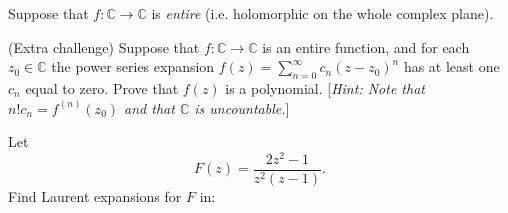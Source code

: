 \documentclass[answers]{exam}
\begin{document}
\begin{questions}
\question%
Suppose that $f:\mathbb C\to\mathbb C$ is \emph{entire} (i.e. holomorphic on the whole complex plane).



\question%
(Extra challenge) Suppose that $f: \mathbb{C} \to \mathbb{C}$ is an entire function, and for each $z_{0} \in \mathbb{C}$ the power series expansion $f(z)=\sum_{n=0}^{\infty} c_{n}(z-z_{0})^{n}$ has at least one $c_{n}$ equal to zero. Prove that $f(z)$ is a polynomial. [\emph{Hint: Note that $n!c_{n}=f^{(n)}(z_{0})$ and that $\mathbb{C}$ is uncountable.}]



\question%



\question%
Let \[
	F(z)=\frac{2z^2-1}{z^2(z-1)}.
\] Find Laurent expansions for $F$ in:
\begin{parts}

\end{parts}
\end{questions}
\end{document}
